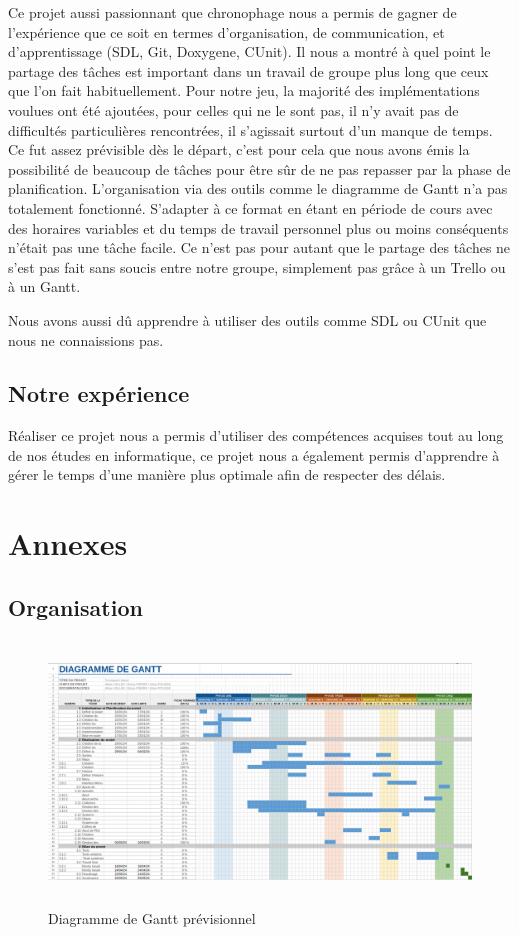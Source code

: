 \documentclass{article}
\begin{document}
Ce projet aussi passionnant que chronophage nous a permis de gagner de l'expérience que ce soit en termes d'organisation, de communication, et d'apprentissage (SDL, Git, Doxygene, CUnit). Il nous a montré à quel point le partage des tâches est important dans un travail de groupe plus long que ceux que l'on fait habituellement.
Pour notre jeu, la majorité des implémentations voulues ont été ajoutées, pour celles qui ne le sont pas, il n'y avait pas de difficultés particulières rencontrées, il s'agissait surtout d'un manque de temps. Ce fut assez prévisible dès le départ, c'est pour cela que nous avons émis la possibilité de beaucoup de tâches pour être sûr de ne pas repasser par la phase de planification.
L'organisation via des outils comme le diagramme de Gantt n'a pas totalement fonctionné. S'adapter à ce format en étant en période de cours avec des horaires variables et du temps de travail personnel plus ou moins conséquents n'était pas une tâche facile. Ce n'est pas pour autant que le partage des tâches ne s'est pas fait sans soucis entre notre groupe, simplement pas grâce à un Trello ou à un Gantt.

Nous avons aussi dû apprendre à utiliser des outils comme SDL ou CUnit que nous ne connaissions pas. 

\subsection{Notre expérience}

Réaliser ce projet nous a permis d'utiliser des compétences acquises tout au long de nos études en informatique, ce projet nous a également permis d'apprendre à gérer le temps d'une manière plus optimale afin de respecter des délais.
\newpage
\section{Annexes}
 \subsection{Organisation}
    \begin{figure}[h]
    \centering
    \includegraphics[height = 7cm]{ganttEntier.png}
    \caption{Diagramme de Gantt prévisionnel}
    \label{fig:gantt_previsionnel}
    \end{figure}
    
\end{document}
